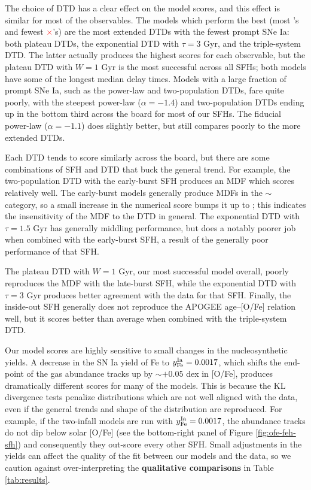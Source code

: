 \documentclass[twocolumn,twocolappendix,linenumbers]{aastex631}
\newcommand{\yes}{\textcolor{green}{\checkmark}\xspace}
\newcommand{\meh}{\textcolor{black}{$\sim$}\xspace}
\newcommand{\no}{\textcolor{red}{$\times$}\xspace}
\begin{document}
The choice of DTD has a clear effect on the model scores, and this effect is similar for most of the observables. The models which perform the best (most \yes's and fewest \no's) are the most extended DTDs with the fewest prompt SNe Ia: both plateau DTDs, the exponential DTD with $\tau=3$ Gyr, and the triple-system DTD. The latter actually produces the highest scores for each observable, but the plateau DTD with $W=1$ Gyr is the most successful across all SFHs; both models have some of the longest median delay times. Models with a large fraction of prompt SNe Ia, such as the power-law and two-population DTDs, fare quite poorly, with the steepest power-law ($\alpha=-1.4$) and two-population DTDs ending up in the bottom third across the board for most of our SFHs. The fiducial power-law ($\alpha=-1.1$) does slightly better, but still compares poorly to the more extended DTDs.

Each DTD tends to score similarly across the board, but there are some combinations of SFH and DTD that buck the general trend. For example, the two-population DTD with the early-burst SFH produces an MDF which scores relatively well. The early-burst models generally produce MDFs in the \meh category, so a small increase in the numerical score bumps it up to \yes; this indicates the insensitivity of the MDF to the DTD in general. The exponential DTD with $\tau=1.5$ Gyr has generally middling performance, but does a notably poorer job when combined with the early-burst SFH, a result of the generally poor performance of that SFH. 

The plateau DTD with $W=1$ Gyr, our most successful model overall, poorly reproduces the MDF with the late-burst SFH, while the exponential DTD with $\tau=3$ Gyr produces better agreement with the data for that SFH. Finally, the inside-out SFH generally does not reproduce the APOGEE age--[O/Fe] relation well, but it scores better than average when combined with the triple-system DTD.

Our model scores are highly sensitive to small changes in the nucleosynthetic yields. A decrease in the SN Ia yield of Fe to $y_{\rm Fe}^{\rm Ia}=0.0017$, which shifts the end-point of the gas abundance tracks up by $\sim+0.05$ dex in [O/Fe], produces dramatically different scores for many of the models. This is because the KL divergence tests penalize distributions which are not well aligned with the data, even if the general trends and shape of the distribution are reproduced. For example, if the two-infall models are run with $y_{\rm Fe}^{\rm Ia}=0.0017$, the abundance tracks do not dip below solar [O/Fe] (see the bottom-right panel of Figure \ref{fig:ofe-feh-sfh}) and consequently they out-score every other SFH. Small adjustments in the yields can affect the quality of the fit between our models and the data, so we caution against over-interpreting the {\bf qualitative comparisons} in Table \ref{tab:results}.
\end{document}
